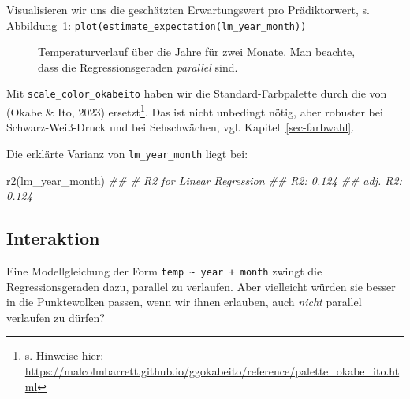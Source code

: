 \documentclass[
  a4paper,
]{scrbook}
\newenvironment{Shaded}{\begin{snugshade}}{\end{snugshade}}
\newcommand{\DocumentationTok}[1]{\textcolor[rgb]{0.37,0.37,0.37}{\textit{#1}}}
\newcommand{\FunctionTok}[1]{\textcolor[rgb]{0.28,0.35,0.67}{#1}}
\newcommand{\NormalTok}[1]{\textcolor[rgb]{0.00,0.23,0.31}{#1}}
\theoremstyle{definition}
\theoremstyle{definition}
\theoremstyle{definition}
\theoremstyle{remark}
\begin{document}
Visualisieren wir uns die geschätzten Erwartungswert pro Prädiktorwert,
s. Abbildung~\ref{fig-lm3}:
\texttt{plot(estimate\_expectation(lm\_year\_month))}

\begin{figure}


\caption{\label{fig-lm3}Temperaturverlauf über die Jahre für zwei
Monate. Man beachte, dass die Regressionsgeraden \emph{parallel} sind.}

\end{figure}%

Mit \texttt{scale\_color\_okabeito} haben wir die Standard-Farbpalette
durch die von (Okabe \& Ito, 2023) ersetzt\footnote{s. Hinweise hier:
  \url{https://malcolmbarrett.github.io/ggokabeito/reference/palette_okabe_ito.html}}.
Das ist nicht unbedingt nötig, aber robuster bei Schwarz-Weiß-Druck und
bei Sehschwächen, vgl. Kapitel~\ref{sec-farbwahl}.

Die erklärte Varianz von \texttt{lm\_year\_month} liegt bei:

\begin{Shaded}
\begin{Highlighting}[]
\FunctionTok{r2}\NormalTok{(lm\_year\_month)}
\DocumentationTok{\#\# \# R2 for Linear Regression}
\DocumentationTok{\#\#        R2: 0.124}
\DocumentationTok{\#\#   adj. R2: 0.124}
\end{Highlighting}
\end{Shaded}

\subsection{Interaktion}\label{interaktion}

Eine Modellgleichung der Form
\texttt{temp\ \textasciitilde{}\ year\ +\ month} zwingt die
Regressionsgeraden dazu, parallel zu verlaufen. Aber vielleicht würden
sie besser in die Punktewolken passen, wenn wir ihnen erlauben, auch
\emph{nicht} parallel verlaufen zu dürfen?
\end{document}
